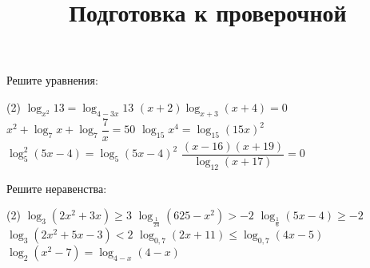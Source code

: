 \begin{class}[number=7]
	\title{Подготовка к проверочной}
	\begin{listofex}
		\item Решите уравнения: %
		\begin{tasks}(2)
			\task \( \log_{x^2}13=\log_{4-3x}13 \)
			\task \( (x+2)\log_{x+3}(x+4)=0 \)
			\task \( x^2+\log_7 x + \log_7 \dfrac{ 7 }{ x }=50 \)
			\task \( \log_{15}x^4=\log_{15}(15x)^2 \)
			\task \( \log_5^2(5x-4)=\log_5 (5x-4)^2 \)
			\task \( \dfrac{ (x-16)(x+19) }{ \log_{12}(x+17) }=0 \)
		\end{tasks}
		\item Решите неравенства: %
		\begin{tasks}(2)
			\task \( \log_3 (2x^2+3x) \ge 3 \)
			\task \( \log_{\tfrac{1}{24}} (625-x^2) > -2 \)
			\task \( \log_{\tfrac{1}{6}}(5x-4) \ge -2 \)
			\task \( \log_3 (2x^2+5x-3) < 2 \)
			\task \( \log_{0,7} (2x+11) \le \log_{0,7} (4x-5) \)
			\task \( \log_2  (x^2-7)=\log_{4-x} (4-x)\)
			
		\end{tasks}
	\end{listofex}
\end{class}

